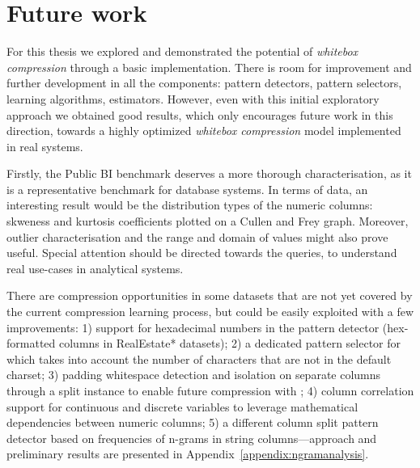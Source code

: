 \section{Future work}

For this thesis we explored and demonstrated the potential of \textit{whitebox compression} through a basic implementation. There is room for improvement and further development in all the components: pattern detectors, pattern selectors, learning algorithms, estimators. However, even with this initial exploratory approach we obtained good results, which only encourages future work in this direction, towards a highly optimized \textit{whitebox compression} model implemented in real systems.

Firstly, the Public BI benchmark deserves a more thorough characterisation, as it is a representative benchmark for database systems. In terms of data, an interesting result would be the distribution types of the numeric columns: skweness and kurtosis coefficients plotted on a Cullen and Frey graph. Moreover, outlier characterisation and the range and domain of values might also prove useful. Special attention should be directed towards the queries, to understand real use-cases in analytical systems.

There are compression opportunities in some datasets that are not yet covered by the current compression learning process, but could be easily exploited with a few improvements: 1) support for hexadecimal numbers in the  pattern detector (hex-formatted columns in RealEstate* datasets); 2) a dedicated pattern selector for  which takes into account the number of characters that are not in the default charset; 3) padding whitespace detection and isolation on separate columns through a split instance to enable future compression with ; 4) column correlation support for continuous and discrete variables to leverage mathematical dependencies between numeric columns; 5) a different column split pattern detector based on frequencies of n-grams in string columns---approach and preliminary results are presented in Appendix~\ref{appendix:ngramanalysis}.

